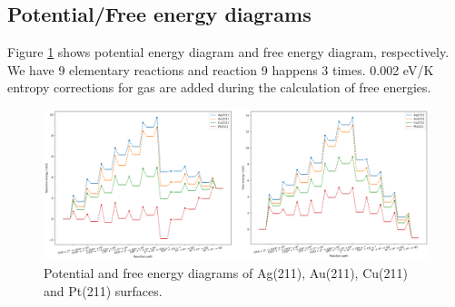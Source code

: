 \documentclass{article}
\begin{document}
    \subsection*{Potential/Free energy diagrams}
    Figure \ref{fig:Energy_diagram} shows potential energy diagram and free energy diagram, respectively. We have 9 elementary reactions and reaction 9 happens 3 times. 0.002 eV/K entropy corrections for gas are added during the calculation of free energies.
    \FloatBarrier
    \begin{figure}[!ht]
        \centering
        \includegraphics[width=1\textwidth]{Pictures/Energy_diagram.png}
        \caption{Potential and free energy diagrams of Ag(211), Au(211), Cu(211) and Pt(211) surfaces.}
        \label{fig:Energy_diagram}
    \end{figure}
    
    

    
\end{document}
